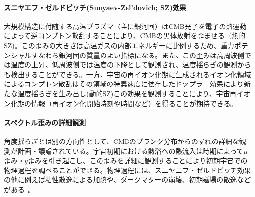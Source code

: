\paragraph{スニヤエフ・ゼルドビッチ(Sunyaev-Zel'dovich; SZ)効果}
大規模構造に付随する高温プラズマ（主に銀河団）はCMB光子を電子の熱運動によって逆コンプトン散乱することにより、CMBの黒体放射を歪ませる（熱的SZ)。この歪みの大きさは高温ガスの内部エネルギーに比例するため、重力ポテンシャルすなわち銀河団の質量のよい指標になる。また、この歪みは高周波側では温度の上昇、低周波側では温度の下降として観測され、温度揺らぎの観測からも検出することができる。一方、宇宙の再イオン化期に生成されるイオン化領域によるコンプトン散乱はその領域の特異速度に依存したドップラー効果により新たな温度揺らぎを生み出し(動的SZ)この効果を観測することにより、宇宙再イオン化期の情報（再イオン化開始時刻や時間など）を得ることが期待できる。


\paragraph{スペクトル歪みの詳細観測}
角度揺らぎとは別の方向性として、CMBのプランク分布からのずれの詳細な観測が計画・議論されている。宇宙初期における熱浴への熱流入は時期によって$\mu$歪み・$y$歪みを引き起こし、この歪みを詳細に観測することにより初期宇宙での物理過程を調べることができる。物理過程には、スニヤエフ・ゼルドビッチ効果の他に例えば粘性散逸による加熱や、ダークマターの崩壊、初期磁場の散逸などがある~\citep{Tashiro:2014pga}。


